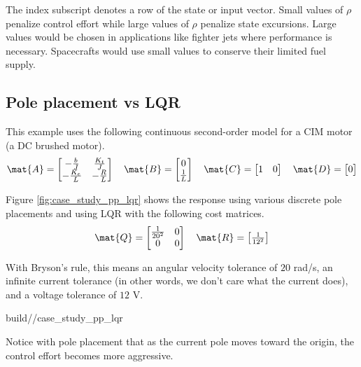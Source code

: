 The index subscript denotes a row of the state or input vector. Small values of
$\rho$ penalize \gls{control effort} while large values of $\rho$ penalize
\gls{state} excursions. Large values would be chosen in applications like
fighter jets where performance is necessary. Spacecrafts would use small values
to conserve their limited fuel supply.

\subsection{Pole placement vs LQR}

This example uses the following continuous second-order \gls{model} for a CIM
motor (a DC brushed motor).
\begin{align*}
  \mat{A} = \begin{bmatrix}
    -\frac{b}{J} & \frac{K_t}{J} \\
    -\frac{K_e}{L} & -\frac{R}{L}
  \end{bmatrix}
  \quad
  \mat{B} = \begin{bmatrix}
    0 \\
    \frac{1}{L}
  \end{bmatrix}
  \quad
  \mat{C} = \begin{bmatrix}
    1 & 0
  \end{bmatrix}
  \quad
  \mat{D} = \begin{bmatrix}
    0
  \end{bmatrix}
\end{align*}

Figure \ref{fig:case_study_pp_lqr} shows the response using various discrete
pole placements and using LQR with the following cost matrices.
\begin{align*}
  \mat{Q} = \begin{bmatrix}
    \frac{1}{20^2} & 0 \\
    0 & 0
  \end{bmatrix}
  \quad
  \mat{R} = \begin{bmatrix}
    \frac{1}{12^2}
  \end{bmatrix}
\end{align*}

With Bryson's rule, this means an angular velocity tolerance of $20$ rad/s, an
infinite current tolerance (in other words, we don't care what the current
does), and a voltage tolerance of $12$ V.
\begin{svg}{build/\chapterpath/case_study_pp_lqr}
  \caption{Second-order CIM motor response with pole placement and LQR}
  \label{fig:case_study_pp_lqr}
\end{svg}

Notice with pole placement that as the current pole moves toward the origin, the
\gls{control effort} becomes more aggressive.
